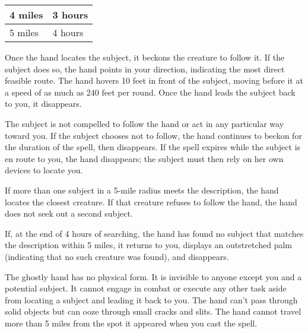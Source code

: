 \begin{longtable}{llll}
{\begin{minipage}[t]{0.906in}
4 miles\end{minipage}} & \multicolumn{3}{p{1.184in}|}{\begin{minipage}[t]{1.184in}\raggedright
3 hours\end{minipage}}\\
\hline
\multicolumn{1}{|p{0.906in}|}{\begin{minipage}[t]{0.906in}\raggedright
5 miles\end{minipage}} & \multicolumn{3}{p{1.184in}|}{\begin{minipage}[t]{1.184in}\raggedright
4 hours\end{minipage}}\\
\hline
\end{longtable}

Once the hand locates the subject, it beckons the creature to follow it. If the 
subject does so, the hand points in your direction, indicating the most direct 
feasible route. The hand hovers 10 feet in front of the subject, moving before 
it at a speed of as much as 240 feet per round. Once the hand leads the subject 
back to you, it disappears.

The subject is not compelled to follow the hand or act in any particular way toward 
you. If the subject chooses not to follow, the hand continues to beckon for the 
duration of the spell, then disappears. If the spell expires while the subject 
is en route to you, the hand disappears; the subject must then rely on her own 
devices to locate you.

If more than one subject in a 5-mile radius meets the description, the hand locates 
the closest creature. If that creature refuses to follow the hand, the hand does 
not seek out a second subject.

If, at the end of 4 hours of searching, the hand has found no subject that matches 
the description within 5 miles, it returns to you, displays an outstretched palm 
(indicating that no such creature was found), and disappears.

The ghostly hand has no physical form. It is invisible to anyone except you and 
a potential subject. It cannot engage in combat or execute any other task aside 
from locating a subject and leading it back to you. The hand can't pass through 
solid objects but can ooze through small cracks and slits. The hand cannot travel 
more than 5 miles from the spot it appeared when you cast the spell.

